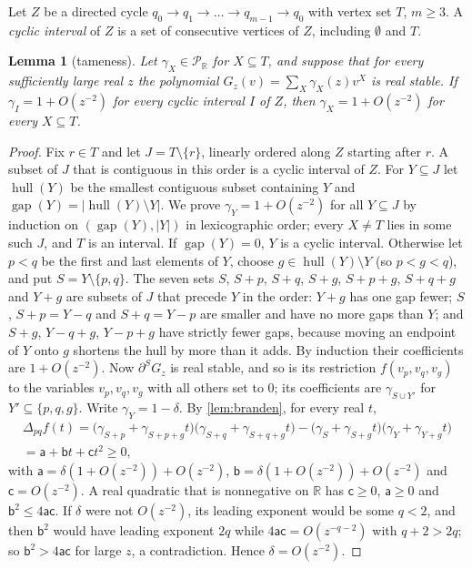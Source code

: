 \documentclass[11pt]{amsart}
\theoremstyle{plain}
\newtheorem{lemma}[theorem]{Lemma}
\theoremstyle{definition}
\theoremstyle{remark}
\numberwithin{equation}{section}
\newcommand{\RR}{\mathbb{R}}
\newcommand{\Puis}{\mathcal{P}_{\RR}}
\begin{document}
Let $Z$ be a directed cycle $q_0\to q_1\to\dots\to q_{m-1}\to q_0$ with vertex set $T$, $m\ge3$. A \emph{cyclic interval} of $Z$ is a set of consecutive vertices of $Z$, including $\emptyset$ and $T$.

\begin{lemma}[tameness]\label{lem:tameness}
Let $\gamma_X\in\Puis$ for $X\subseteq T$, and suppose that for every sufficiently large real $z$ the polynomial $G_z(v)=\sum_{X}\gamma_X(z)v^X$ is real stable. If $\gamma_I=1+O(z^{-2})$ for every cyclic interval $I$ of $Z$, then $\gamma_X=1+O(z^{-2})$ for every $X\subseteq T$.
\end{lemma}

\begin{proof}
Fix $r\in T$ and let $J=T\setminus\{r\}$, linearly ordered along $Z$ starting after $r$. A subset of $J$ that is contiguous in this order is a cyclic interval of $Z$. For $Y\subseteq J$ let $\operatorname{hull}(Y)$ be the smallest contiguous subset containing $Y$ and $\operatorname{gap}(Y)=|\operatorname{hull}(Y)\setminus Y|$. We prove $\gamma_Y=1+O(z^{-2})$ for all $Y\subseteq J$ by induction on $(\operatorname{gap}(Y),|Y|)$ in lexicographic order; every $X\ne T$ lies in some such $J$, and $T$ is an interval.
If $\operatorname{gap}(Y)=0$, $Y$ is a cyclic interval. Otherwise let $p<q$ be the first and last elements of $Y$, choose $g\in\operatorname{hull}(Y)\setminus Y$ (so $p<g<q$), and put $S=Y\setminus\{p,q\}$. The seven sets $S$, $S+p$, $S+q$, $S+g$, $S+p+g$, $S+q+g$ and $Y+g$ are subsets of $J$ that precede $Y$ in the order: $Y+g$ has one gap fewer; $S$, $S+p=Y-q$ and $S+q=Y-p$ are smaller and have no more gaps than $Y$; and $S+g$, $Y-q+g$, $Y-p+g$ have strictly fewer gaps, because moving an endpoint of $Y$ onto $g$ shortens the hull by more than it adds. By induction their coefficients are $1+O(z^{-2})$.
Now $\partial^S G_z$ is real stable, and so is its restriction $f(v_p,v_q,v_g)$ to the variables $v_p,v_q,v_g$ with all others set to $0$; its coefficients are $\gamma_{S\cup Y'}$ for $Y'\subseteq\{p,q,g\}$. Write $\gamma_Y=1-\delta$. By \cref{lem:branden}, for every real $t$,
\begin{multline*}
\Delta_{pq}f(t)=\bigl(\gamma_{S+p}+\gamma_{S+p+g}t\bigr)\bigl(\gamma_{S+q}+\gamma_{S+q+g}t\bigr)-\bigl(\gamma_S+\gamma_{S+g}t\bigr)\bigl(\gamma_Y+\gamma_{Y+g}t\bigr)\\
=\mathsf a+\mathsf bt+\mathsf ct^2\ge0,
\end{multline*}
with $\mathsf a=\delta(1+O(z^{-2}))+O(z^{-2})$, $\mathsf b=\delta(1+O(z^{-2}))+O(z^{-2})$ and $\mathsf c=O(z^{-2})$. A real quadratic that is nonnegative on $\RR$ has $\mathsf c\ge0$, $\mathsf a\ge0$ and $\mathsf b^2\le4\mathsf a\mathsf c$. If $\delta$ were not $O(z^{-2})$, its leading exponent would be some $q<2$, and then $\mathsf b^2$ would have leading exponent $2q$ while $4\mathsf a\mathsf c=O(z^{-q-2})$ with $q+2>2q$; so $\mathsf b^2>4\mathsf a\mathsf c$ for large $z$, a contradiction. Hence $\delta=O(z^{-2})$.
\end{proof}
\end{document}
